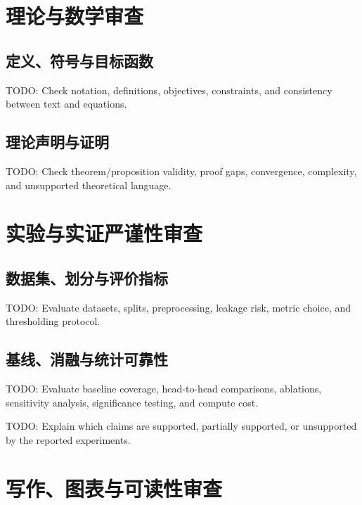 \documentclass[11pt,a4paper]{article}
\begin{document}
\section{理论与数学审查}

\subsection{定义、符号与目标函数}
TODO: Check notation, definitions, objectives, constraints, and consistency between text and equations.

\subsection{理论声明与证明}
TODO: Check theorem/proposition validity, proof gaps, convergence, complexity, and unsupported theoretical language.

\section{实验与实证严谨性审查}

\subsection{数据集、划分与评价指标}
TODO: Evaluate datasets, splits, preprocessing, leakage risk, metric choice, and thresholding protocol.

\subsection{基线、消融与统计可靠性}
TODO: Evaluate baseline coverage, head-to-head comparisons, ablations, sensitivity analysis, significance testing, and compute cost.

\begin{evidencebox}
TODO: Explain which claims are supported, partially supported, or unsupported by the reported experiments.
\end{evidencebox}

\section{写作、图表与可读性审查}
\end{document}
